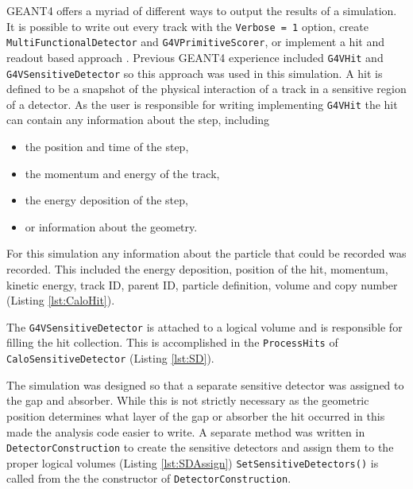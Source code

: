 GEANT4 offers a myriad of different ways to output the results of a simulation.
It is possible to write out every track with the \verb+Verbose = 1+ option, create \verb+MultiFunctionalDetector+ and \verb+G4VPrimitiveScorer+, or implement a hit and readout based approach \cite{cern_detector_2012}.
Previous GEANT4 experience included \verb+G4VHit+ and \verb+G4VSensitiveDetector+ so this approach was used in this simulation. 
A hit is defined to be a snapshot of the physical interaction of a track in a sensitive region of a detector.
As the user is responsible for writing implementing \verb+G4VHit+ the hit can contain any information about the step, including
\begin{itemize}
	\item the position and time of the step,
	\item the momentum and energy of the track,
	\item the energy deposition of the step,
	\item or information about the geometry.
\end{itemize}
For this simulation any information about the particle that could be recorded was recorded. 
This included the energy deposition, position of the hit, momentum, kinetic energy, track ID, parent ID, particle definition, volume and copy number (Listing \ref{lst:CaloHit}).

The \verb+G4VSensitiveDetector+ is attached to a logical volume and is responsible for filling the hit collection.
This is accomplished in the \verb+ProcessHits+ of \verb+CaloSensitiveDetector+ (Listing \ref{lst:SD}).

The simulation was designed so that a separate sensitive detector was assigned to the gap and absorber.
While this is not strictly necessary as the geometric position determines what layer of the gap or absorber the hit occurred in this made the analysis code easier to write.
A separate method was written in \verb+DetectorConstruction+ to create the sensitive detectors and assign them to the proper logical volumes (Listing \ref{lst:SDAssign})
\verb+SetSensitiveDetectors()+ is called from the the constructor of \verb+DetectorConstruction+.


